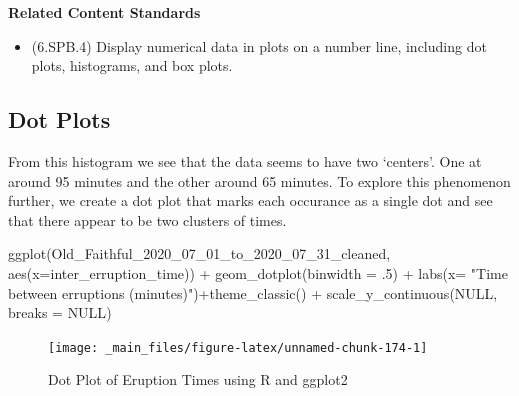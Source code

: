 \documentclass[
]{book}
\newenvironment{Shaded}{\begin{snugshade}}{\end{snugshade}}
\newcommand{\AttributeTok}[1]{\textcolor[rgb]{0.77,0.63,0.00}{#1}}
\newcommand{\ConstantTok}[1]{\textcolor[rgb]{0.00,0.00,0.00}{#1}}
\newcommand{\DecValTok}[1]{\textcolor[rgb]{0.00,0.00,0.81}{#1}}
\newcommand{\FunctionTok}[1]{\textcolor[rgb]{0.00,0.00,0.00}{#1}}
\newcommand{\NormalTok}[1]{#1}
\newcommand{\SpecialCharTok}[1]{\textcolor[rgb]{0.00,0.00,0.00}{#1}}
\newcommand{\StringTok}[1]{\textcolor[rgb]{0.31,0.60,0.02}{#1}}
\providecommand{\tightlist}{%
  \setlength{\itemsep}{0pt}\setlength{\parskip}{0pt}}
\newenvironment{standards}{}{}
\theoremstyle{definition}
\theoremstyle{definition}
\theoremstyle{definition}
\theoremstyle{definition}
\theoremstyle{remark}
\begin{document}
\begin{standards}

\begin{center}
\textbf{Related Content Standards}

\end{center}

\begin{itemize}
\tightlist
\item
  (6.SPB.4) Display numerical data in plots on a number line, including dot plots, histograms, and box plots.
\end{itemize}

\end{standards}

\hypertarget{dot-plots}{%
\subsection{Dot Plots}\label{dot-plots}}

From this histogram we see that the data seems to have two `centers'. One at around 95 minutes and the other around 65 minutes. To explore this phenomenon further, we create a dot plot that marks each occurance as a single dot and see that there appear to be two clusters of times.

\begin{Shaded}
\begin{Highlighting}[]
\FunctionTok{ggplot}\NormalTok{(Old\_Faithful\_2020\_07\_01\_to\_2020\_07\_31\_cleaned, }\FunctionTok{aes}\NormalTok{(}\AttributeTok{x=}\NormalTok{inter\_erruption\_time)) }\SpecialCharTok{+} \FunctionTok{geom\_dotplot}\NormalTok{(}\AttributeTok{binwidth =}\NormalTok{ .}\DecValTok{5}\NormalTok{) }\SpecialCharTok{+} \FunctionTok{labs}\NormalTok{(}\AttributeTok{x=} \StringTok{"Time between erruptions (minutes)"}\NormalTok{)}\SpecialCharTok{+}\FunctionTok{theme\_classic}\NormalTok{() }\SpecialCharTok{+} \FunctionTok{scale\_y\_continuous}\NormalTok{(}\ConstantTok{NULL}\NormalTok{, }\AttributeTok{breaks =} \ConstantTok{NULL}\NormalTok{)}
\end{Highlighting}
\end{Shaded}

\begin{figure}

{\centering \texttt{[image: \_main\_files/figure-latex/unnamed-chunk-174-1]} 

}

\caption{Dot Plot of Eruption Times using R and ggplot2}\label{fig:unnamed-chunk-174}
\end{figure}
\end{document}
